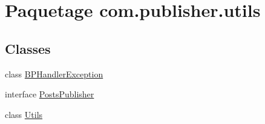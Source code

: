 \hypertarget{namespacecom_1_1publisher_1_1utils}{\section{Paquetage com.\-publisher.\-utils}
\label{namespacecom_1_1publisher_1_1utils}
}
\subsection*{Classes}
\begin{DoxyCompactItemize}
\item 
class \hyperlink{classcom_1_1publisher_1_1utils_1_1BPHandlerException}{B\-P\-Handler\-Exception}
\item 
interface \hyperlink{interfacecom_1_1publisher_1_1utils_1_1PostsPublisher}{Posts\-Publisher}
\item 
class \hyperlink{classcom_1_1publisher_1_1utils_1_1Utils}{Utils}
\end{DoxyCompactItemize}
